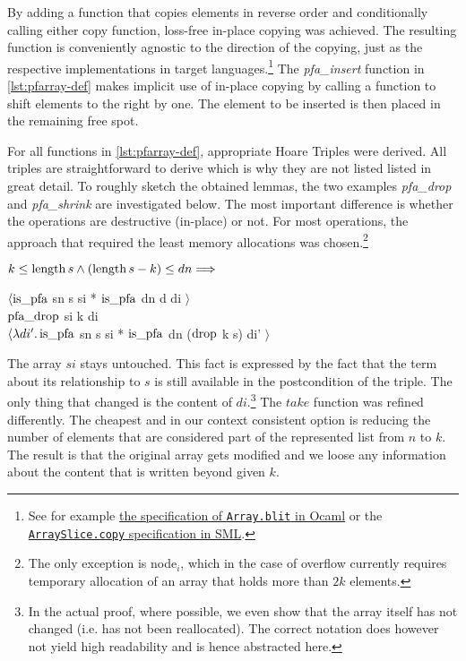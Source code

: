 By adding a function that copies elements in reverse order
and conditionally calling either copy function,
loss-free in-place copying was achieved.
The resulting function is conveniently agnostic to the direction
of the copying, just as the respective implementations
in target languages.\footnote{
    See for example \href{https://caml.inria.fr/pub/docs/manual-ocaml/libref/Array.html}{the specification of \texttt{Array.blit} in Ocaml} or
    the \href{https://smlfamily.github.io/Basis/array-slice.html\#SIG:ARRAY_SLICE.copy:VAL}{\texttt{ArraySlice.copy} specification in SML}.
}
The \textit{pfa\_insert} function in \autoref{lst:pfarray-def} makes
implicit use of in-place copying by calling a function to shift elements
to the right by one.
The element to be inserted is then placed in the remaining free spot.

For all functions in \autoref{lst:pfarray-def},
appropriate Hoare Triples were derived.
All triples are straightforward to derive which is why they are not
listed listed in great detail.
To roughly sketch the obtained lemmas, the two examples
\textit{pfa\_drop} and \textit{pfa\_shrink} are investigated below.
The most important difference is whether
the operations are destructive (in-place) or not.
For most operations, the approach that required the least
memory allocations was chosen.\footnote{
    The only exception is node$_i$, which in the case of overflow
    currently requires temporary allocation of an array that holds more than $2k$ elements.
}

\begin{lemma}
    $k \le \operatorname{length} s \wedge (\operatorname{length} s - k) \le dn \Longrightarrow$ \\
    \begin{center}
    $\langle \operatorname{is\_pfa}$ sn s si * $\operatorname{is\_pfa}$ dn d di $\rangle$ \\
    $\operatorname{pfa\_drop}$ si k di \\
    $\langle\lambda di'. \operatorname{is\_pfa}$ sn s si * $\operatorname{is\_pfa}$ dn ($\operatorname{drop}$ k s) di' $\rangle$
    \end{center}
\end{lemma}

The array $si$ stays untouched.
This fact is expressed by the fact that the term about its relationship to $s$
is still available in the postcondition of the triple.
The only thing that changed is the content of $di$.\footnote{
    In the actual proof, where possible, we even show that the array itself has not changed
    (i.e. has not been reallocated).
    The correct notation does however not yield high readability
    and is hence abstracted here.
}
The $take$ function was refined differently.
The cheapest and in our context consistent option is
reducing the number of elements that are considered part of the represented list
from $n$ to $k$.
The result is that the original array gets modified and we loose any information
about the content that is written beyond given $k$.

